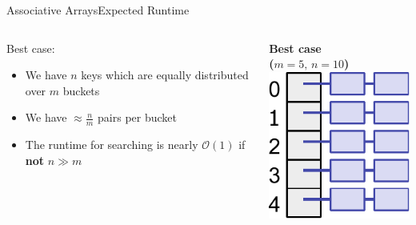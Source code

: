 \begin{frame}{Associative Arrays}{Expected Runtime}
  \begin{columns}
    \begin{column}{0.5\linewidth}
      {\color{MainA}Best case}:
      \begin{itemize}
        \item
          We have {\color{MainA}$n$} keys which are equally distributed over {\color{MainA}$m$} buckets
        \item
          We have {\color{MainA}$\approx \frac{n}{m}$} pairs per bucket
        \item
          The runtime for searching is nearly {\color{MainA}$\mathcal{O}(1)$}
          if \textbf{not} {\color{MainA}$n \gg m$}
      \end{itemize}
    \end{column}
    \begin{column}{0.5\linewidth}
      \begin{center}
        \textbf{Best case}\\
        \textbf{($m = 5, \, n = 10$)}\\[1em]
        \includegraphics[height=0.4\textheight]{Images/hash-uniform.pdf}

\end{center}
\end{column}
\end{columns}
\end{frame}
